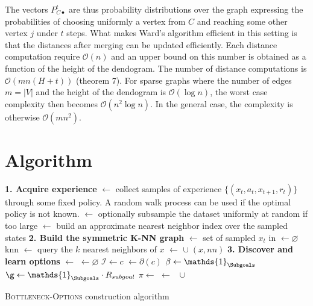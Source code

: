 \documentclass[12pt, oneside, extrafontsizes]{memoir}  %
\def\indicator{\mathds{1}}
\theoremstyle{plain}
\theoremstyle{definition}
\begin{document}
The vectors $P^t_{C\bullet}$ are thus probability distributions over the graph expressing the probabilities of choosing uniformly a vertex from $C$ and reaching some other vertex $j$ under $t$ steps. What makes Ward's algorithm efficient in this setting is that the distances after merging can be updated efficiently. Each distance computation require $\mathcal{O}(n)$ and an upper bound on this number is obtained as a function of the height of the dendogram. The number of distance computations is $\mathcal{O}(mn(H + t))$ \cite{Pons2005} (theorem 7). For sparse graphs where the number of edges $m = |V|$ and the height of the dendogram is $\mathcal{O}(\log n)$, the worst case complexity then becomes $\mathcal{O}(n^2 \log n)$. In the general case, the complexity is otherwise $\mathcal{O}(mn^2)$. 

\section{Algorithm}
\begin{algorithm}
\DontPrintSemicolon
{}
\;

\textbf{1. Acquire experience} \;
\Dataset $\leftarrow$ collect samples of experience $\{(x_t, a_t, x_{t+1}, r_{t})\}$ through some fixed policy. A random walk process can be used if the optimal policy is not known. \;
\Dataset $\leftarrow$ optionally subsample the dataset uniformly at random if too large\;
\Index $\leftarrow$ build an approximate nearest neighbor index over the sampled states\;
\;
\textbf{2. Build the symmetric K-NN graph}\;
\Vertices $\leftarrow $ set of sampled $x_t$ in \Dataset \;
\Edges $\leftarrow \varnothing$\;
 {
knn $\leftarrow$ query the $k$ nearest neighbors of $x$\;
   {
     {
    \Edges $\leftarrow$ \Edges $\cup \; (x, nn)$
    }
  }
}
\;
\textbf{3. Discover and learn options} \;
\Communities $\leftarrow$  \;
\Options $\leftarrow \varnothing$ \;
 {
  $\mathcal{I} \leftarrow c$\;
  \Subgoals $\leftarrow \partial(c)$\;
  $\beta \leftarrow \indicator_{\Subgoals}$ \;
   $\g \leftarrow \indicator_{\Subgoals}\cdot R_{subgoal}$\;
   $\pi \leftarrow$ \LearnMDP{\g} \;
   \Options $\leftarrow$ \Options $\; \cup \;$  \;
}
\Return \Options
\caption{\textsc{Bottleneck-Options} construction algorithm}
\label{alg:knnoptions}
\end{algorithm}
\end{document}
